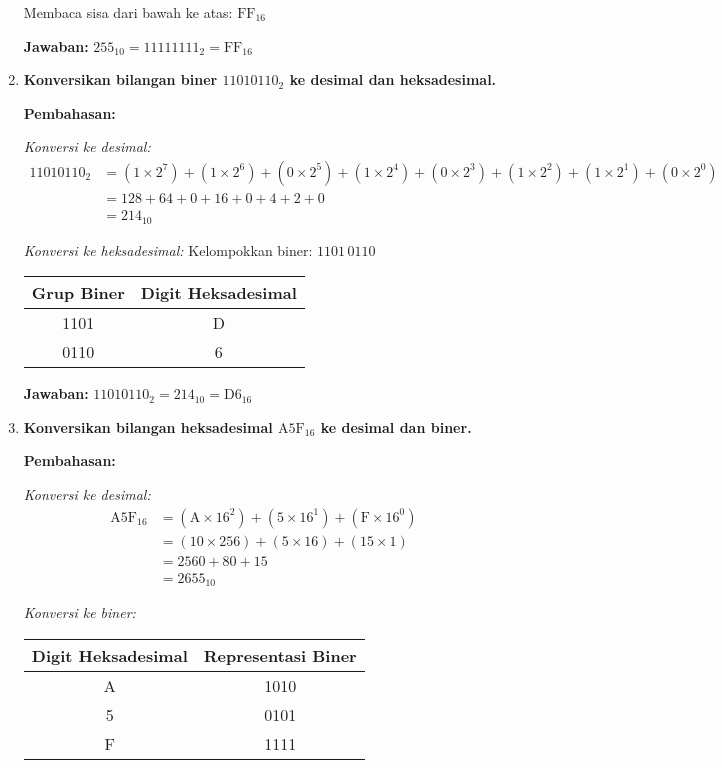 \documentclass[../main.tex]{subfiles}
\begin{document}
\begin{enumerate}
    Membaca sisa dari bawah ke atas: \(\mathrm{FF}_{16}\)
    
    \textbf{Jawaban:} \(255_{10} = 11111111_2 = \mathrm{FF}_{16}\)

    \item \textbf{Konversikan bilangan biner \(11010110_2\) ke desimal dan heksadesimal.}
    
    \textbf{Pembahasan:}
    
    \textit{Konversi ke desimal:}
    \begin{align*}
    11010110_2 &= (1 \times 2^7) + (1 \times 2^6) + (0 \times 2^5) + (1 \times 2^4) + (0 \times 2^3) + (1 \times 2^2) + (1 \times 2^1) + (0 \times 2^0) \\
    &= 128 + 64 + 0 + 16 + 0 + 4 + 2 + 0 \\
    &= 214_{10}
    \end{align*}
    
    \textit{Konversi ke heksadesimal:}
    Kelompokkan biner: \(1101\,0110\)
    \begin{center}
    \begin{tabular}{|c|c|}
    \hline
    \textbf{Grup Biner} & \textbf{Digit Heksadesimal} \\
    \hline
    1101 & D \\
    0110 & 6 \\
    \hline
    \end{tabular}
    \end{center}
    
    \textbf{Jawaban:} \(11010110_2 = 214_{10} = \mathrm{D6}_{16}\)

    \item \textbf{Konversikan bilangan heksadesimal \(\mathrm{A5F}_{16}\) ke desimal dan biner.}
    
    \textbf{Pembahasan:}
    
    \textit{Konversi ke desimal:}
    \begin{align*}
    \mathrm{A5F}_{16} &= (\mathrm{A} \times 16^2) + (5 \times 16^1) + (\mathrm{F} \times 16^0) \\
    &= (10 \times 256) + (5 \times 16) + (15 \times 1) \\
    &= 2560 + 80 + 15 \\
    &= 2655_{10}
    \end{align*}
    
    \textit{Konversi ke biner:}
    \begin{center}
    \begin{tabular}{|c|c|}
    \hline
    \textbf{Digit Heksadesimal} & \textbf{Representasi Biner} \\
    \hline
    A & 1010 \\
    5 & 0101 \\
    F & 1111 \\
    \hline
    \end{tabular}
    \end{center}
    

\end{enumerate}
\end{document}
